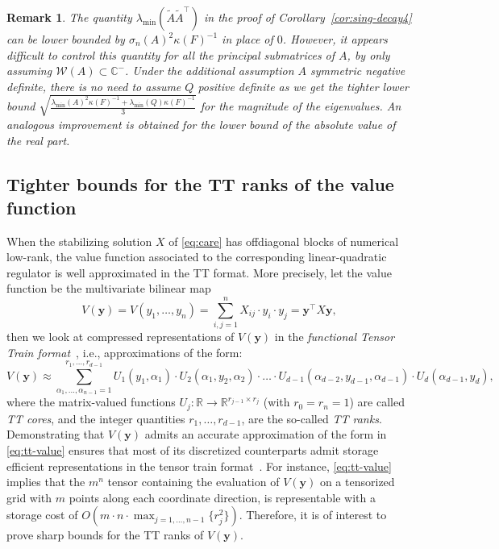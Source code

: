 \documentclass[a4paper,10pt]{article}
\newtheorem{remark}{Remark}
\newcommand{\upd}[1]{{\color{black}#1}} %
\begin{document}
\begin{remark}
The quantity $\lambda_{\min}(\widetilde A\widetilde A^\top)$ in the proof of Corollary~\ref{cor:sing-decay4} can be lower bounded by $\sigma_n(A)^2\kappa(F)^{-1}$ in place of $0$. However, it appears difficult to control this quantity for all the principal submatrices of $A$, by only assuming  $\mathcal W(A)\subset \mathbb C^-$. Under the additional assumption $A$ symmetric negative definite, there is no need to assume $Q$ positive definite as we  get the tighter lower bound $\sqrt{\frac{\lambda_{\min}(A)^2\kappa(F)^{-1}+\lambda_{\min}(Q)\kappa(F)^{-1}}{3}}$ for the magnitude of the eigenvalues. An analogous improvement is obtained for the lower bound of the absolute value of the real part.
\end{remark}



\subsection{Tighter bounds for the TT ranks of the value function}\label{sec:tt}
When the stabilizing solution $X$ of \eqref{eq:care} has offdiagonal blocks of numerical low-rank, the value function associated to the corresponding linear-quadratic regulator is well approximated in the TT format.
More precisely, let the value function be the multivariate bilinear map
$$
V(\mathbf y)=V(y_1, \dots, y_n) = \sum_{i,j=1}^nX_{ij} \cdot y_i\cdot y_j = \mathbf y^\top X\mathbf y,
$$
\upd{then} we look at compressed representations of $V(\mathbf y)$ in the \emph{functional Tensor Train format}~\cite{oseledets13}, i.e., approximations of the form:
\begin{equation}\label{eq:tt-value}
	V(\mathbf y)\approx \sum_{\alpha_1,\dots, \alpha_{n-1}=1}^{r_1,\dots,r_{d-1}} U_1(y_1,\alpha_1)\cdot U_2(\alpha_1, y_2,\alpha_2)\cdot \ldots\cdot U_{d-1}(\alpha_{d-2}, y_{d-1},\alpha_{d-1})\cdot U_d(\alpha_{d-1}, y_d),
\end{equation}
where the matrix-valued functions $U_j:\mathbb R\rightarrow \mathbb R^{r_{j-1}\times r_j}$ (with $r_0=r_n=1$) are called \emph{TT cores}, and the integer quantities $r_1,\dots, r_{d-1}$, are the so-called \emph{TT ranks}. Demonstrating that $V(\mathbf y)$ admits an accurate approximation of the form in \eqref{eq:tt-value} ensures that most of its discretized counterparts admit storage efficient representations in the tensor train format~\cite{oseledets11}. For instance, \eqref{eq:tt-value} implies that the $m^n$ tensor containing the evaluation of $V(\mathbf y)$ on a tensorized grid with $m$ points along each coordinate direction, is representable with a storage cost of $O(m\cdot n\cdot \max_{j=1,\dots, n-1}\{r_j^2\})$. Therefore, it is of interest to prove sharp bounds for the TT ranks of $V(\mathbf y)$. 
\end{document}
